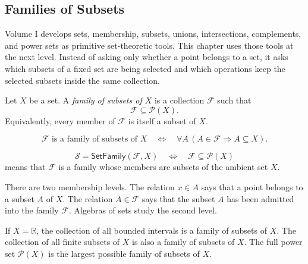\subsection{Families of Subsets}

\begin{remark*}[Exposition]
Volume I develops sets, membership, subsets, unions, intersections,
complements, and power sets as primitive set-theoretic tools.  This chapter
uses those tools at the next level.  Instead of asking only whether a point
belongs to a set, it asks which subsets of a fixed set are being selected and
which operations keep the selected subsets inside the same collection.
\end{remark*}

\begin{definition}\label{def:family-of-subsets}
Let \(X\) be a set.  A \emph{family of subsets of \(X\)} is a collection
\(\mathcal{F}\) such that
\[
  \mathcal{F} \subseteq \mathcal{P}(X).
\]
Equivalently, every member of \(\mathcal{F}\) is itself a subset of \(X\).
\end{definition}

\begin{remark*}
\[
  \mathcal{F}\text{ is a family of subsets of }X
  \quad\Longleftrightarrow\quad
  \forall A\,(A\in\mathcal{F}\Rightarrow A\subseteq X).
\]
\end{remark*}

\begin{remark*}
\[
\mathcal{S}=\mathsf{SetFamily}(\mathcal{F},X)
\quad\Longleftrightarrow\quad
\mathcal{F}\subseteq\mathcal{P}(X)
\]
means that \(\mathcal{F}\) is a family whose members are subsets of the
ambient set \(X\).
\end{remark*}

\begin{remark*}[Interpretation]
There are two membership levels.  The relation \(x\in A\) says that a point
belongs to a subset \(A\) of \(X\).  The relation \(A\in\mathcal{F}\) says
that the subset \(A\) has been admitted into the family \(\mathcal{F}\).
Algebras of sets study the second level.
\end{remark*}

\begin{remark*}[Examples]
If \(X=\mathbb{R}\), the collection of all bounded intervals is a family of
subsets of \(X\).  The collection of all finite subsets of \(X\) is also a
family of subsets of \(X\).  The full power set \(\mathcal{P}(X)\) is the
largest possible family of subsets of \(X\).
\end{remark*}

